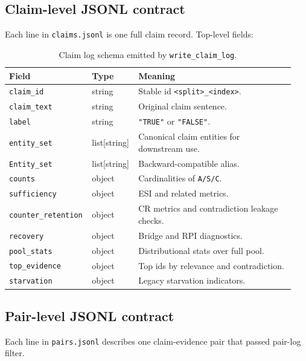 \subsection{Claim-level JSONL contract}
Each line in \texttt{claims.jsonl} is one full claim record.
Top-level fields:
\begin{table}[H]
\centering
\begin{tabular}{@{}p{0.24\linewidth}p{0.16\linewidth}p{0.54\linewidth}@{}}
\toprule
Field & Type & Meaning \\
\midrule
\texttt{claim\_id} & string & Stable id \texttt{<split>\_<index>}. \\
\texttt{claim\_text} & string & Original claim sentence. \\
\texttt{label} & string & \texttt{"TRUE"} or \texttt{"FALSE"}. \\
\texttt{entity\_set} & list[string] & Canonical claim entities for downstream use. \\
\texttt{Entity\_set} & list[string] & Backward-compatible alias. \\
\texttt{counts} & object & Cardinalities of \texttt{A/S/C}. \\
\texttt{sufficiency} & object & ESI and related metrics. \\
\texttt{counter\_retention} & object & CR metrics and contradiction leakage checks. \\
\texttt{recovery} & object & Bridge and RPI diagnostics. \\
\texttt{pool\_stats} & object & Distributional stats over full pool. \\
\texttt{top\_evidence} & object & Top ids by relevance and contradiction. \\
\texttt{starvation} & object & Legacy starvation indicators. \\
\bottomrule
\end{tabular}
\caption{Claim log schema emitted by \texttt{write\_claim\_log}.}
\label{tab:c1_claim_log_schema}
\end{table}

\subsection{Pair-level JSONL contract}
Each line in \texttt{pairs.jsonl} describes one claim-evidence pair that passed pair-log filter.

